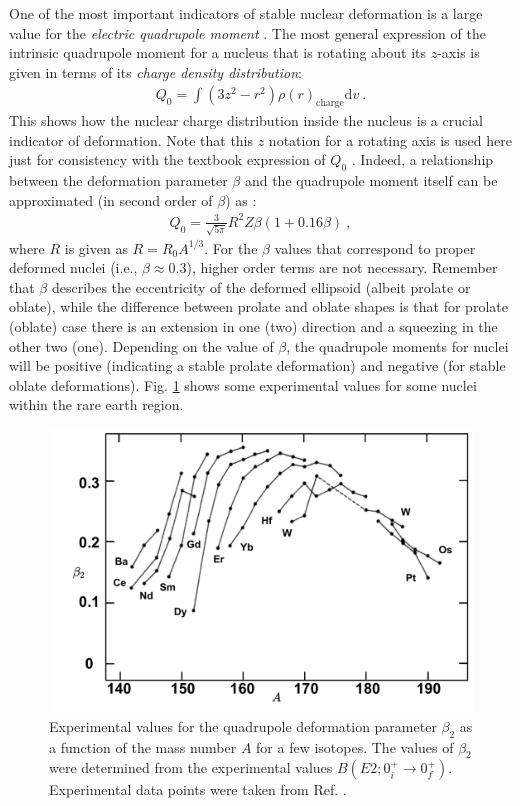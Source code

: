 One of the most important indicators of stable nuclear deformation is a large value for the \emph{electric quadrupole moment} \cite{hamamoto2016interplay}. The most general expression of the intrinsic quadrupole moment for a nucleus that is rotating about its $z$-axis is given in terms of its \emph{charge density distribution}:
\begin{align}
    Q_0=\int(3z^2-r^2)\rho(r)_\text{charge}\text{d}v\ .
\end{align}
This shows how the nuclear charge distribution inside the nucleus is a crucial indicator of deformation. Note that this $z$ notation for a rotating axis is used here just for consistency with the textbook expression of $Q_0$ \cite{casten2000nuclear}. Indeed, a relationship between the deformation parameter $\beta$ and the quadrupole moment itself can be approximated (in second order of $\beta$) as \cite{raduta2018wobbling}:
\begin{align}
    Q_0=\frac{3}{\sqrt{5\pi}}R^2Z\beta(1+0.16\beta)\ ,
    \label{quadrupole-moment-Q0}
\end{align}
where $R$ is given as $R=R_0A^{1/3}$. For the $\beta$ values that correspond to proper deformed nuclei (i.e., $\beta\approx 0.3$), higher order terms are not necessary. Remember that $\beta$ describes the eccentricity of the deformed ellipsoid (albeit prolate or oblate), while the difference between prolate and oblate shapes is that for prolate (oblate) case there is an extension in one (two) direction and a squeezing in the other two (one). Depending on the value of $\beta$, the quadrupole moments for nuclei will be positive (indicating a stable prolate deformation) and negative (for stable oblate deformations). Fig. \ref{fig-quadrupole-beta-nuclides} shows some experimental values for some nuclei within the rare earth region.
\begin{figure}
    \centering
    \includegraphics[scale=0.55]{Chapters/Figures/quadrupole_Deformation_rareEarth.pdf}
    \caption{Experimental values for the quadrupole deformation parameter $\beta_2$ as a function of the mass number $A$ for a few isotopes. The values of $\beta_2$ were determined from the experimental values $B(E2;0_i^+\to 0_f^+)$. Experimental data points were taken from Ref. \cite{krane1991introductory}.}
    \label{fig-quadrupole-beta-nuclides}
\end{figure}

